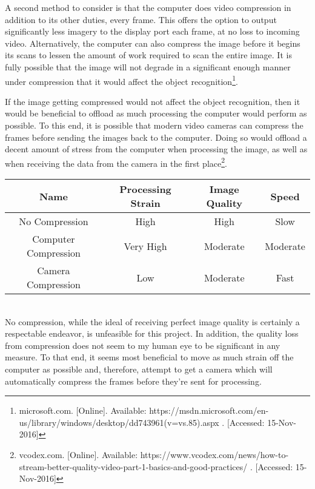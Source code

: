 \documentclass[letterpaper,10pt,onecolumn,draftclsnofoot]{IEEEtran}
\begin{document}
A second method to consider is that the computer does video compression in addition to its other duties, every frame.  This offers the option to output significantly less imagery to the display port each frame, at no loss to incoming video.  Alternatively, the computer can also compress the image before it begins its scans to lessen the amount of work required to scan the entire image.  It is fully possible that the image will not degrade in a significant enough manner under compression that it would affect the object recognition\footnote{microsoft.com. [Online]. Available: https://msdn.microsoft.com/en-us/library/windows/desktop/dd743961(v=vs.85).aspx . [Accessed: 15-Nov-2016] }. 

If the image getting compressed would not affect the object recognition, then it would be beneficial to offload as much processing the computer would perform as possible.  To this end, it is possible that modern video cameras can compress the frames before sending the images back to the computer.  Doing so would offload a decent amount of stress from the computer when processing the image, as well as when receiving the data from the camera in the first place\footnote{vcodex.com. [Online]. Available: https://www.vcodex.com/news/how-to-stream-better-quality-video-part-1-basics-and-good-practices/ . [Accessed: 15-Nov-2016] }. \\

\begin{tabular}{|c|c|c|c|}
  \hline
  \textbf{Name} & \textbf{Processing Strain} & \textbf{Image Quality} & \textbf{Speed} \\
  \hline
  No Compression & High & High & Slow \\ 
  \hline
  Computer Compression & Very High & Moderate & Moderate  \\ 
  \hline
  Camera Compression & Low & Moderate & Fast \\ 
  \hline
\end{tabular} \\

No compression, while the ideal of receiving perfect image quality is certainly a respectable endeavor, is unfeasible for this project.  In addition, the quality loss from compression does not seem to my human eye to be significant in any measure.  To that end, it seems most beneficial to move as much strain off the computer as possible and, therefore, attempt to get a camera which will automatically compress the frames before they're sent for processing.
\end{document}
